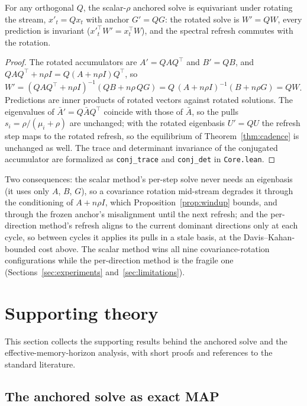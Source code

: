 \begin{proposition}
\label{prop:invariance}
For any orthogonal $Q$, the scalar-$\rho$ anchored solve is equivariant under rotating the stream, $x'_t = Qx_t$ with anchor $G' = QG$: the rotated solve is $W' = QW$, every prediction is invariant ($x'^\top_t W' = x^\top_t W$), and the spectral refresh commutes with the rotation.
\end{proposition}
\begin{proof}
The rotated accumulators are $A' = QAQ^\top$ and $B' = QB$, and $QAQ^\top + n\rho I = Q(A + n\rho I)Q^\top$, so
$W' = (QAQ^\top + n\rho I)^{-1}(QB + n\rho\,QG) = Q\,(A + n\rho I)^{-1}(B + n\rho G) = QW$.
Predictions are inner products of rotated vectors against rotated solutions.
The eigenvalues of $\bar A' = Q\bar A Q^\top$ coincide with those of $\bar A$, so the pulls $s_i = \rho/(\mu_i + \rho)$ are unchanged; with the rotated eigenbasis $U' = QU$ the refresh step maps to the rotated refresh, so the equilibrium of Theorem~\ref{thm:cadence} is unchanged as well.
The trace and determinant invariance of the conjugated accumulator are formalized as \texttt{conj\_trace} and \texttt{conj\_det} in \texttt{Core.lean}.
\end{proof}
Two consequences: the scalar method's per-step solve never needs an eigenbasis (it uses only $A$, $B$, $G$), so a covariance rotation mid-stream degrades it through the conditioning of $A + n\rho I$, which Proposition~\ref{prop:windup} bounds, and through the frozen anchor's misalignment until the next refresh; and the per-direction method's refresh aligns to the current dominant directions only at each cycle, so between cycles it applies its pulls in a stale basis, at the Davis--Kahan-bounded cost above. The scalar method wins all nine covariance-rotation configurations while the per-direction method is the fragile one (Sections~\ref{sec:experiments} and~\ref{sec:limitations}).

\section{Supporting theory}
\label{app:support}

This section collects the supporting results behind the anchored solve and the effective-memory-horizon analysis, with short proofs and references to the standard literature.

\subsection{The anchored solve as exact MAP}
\label{app:support-map}

